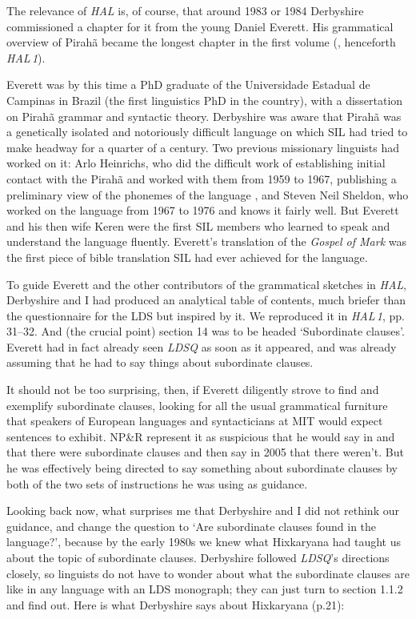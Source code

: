 \documentclass[output=paper,colorlinks,citecolor=brown
]{langscibook}
\begin{document}
The relevance of \textit{HAL} is, of course, that around 1983 or 1984
Derbyshire commissioned a chapter for it from the young Daniel Everett.
His grammatical overview of Pirah{\~a} became the longest chapter in
the first volume (\citealt{DerbPull86}, henceforth \textit{HAL\,1}).

Everett was by this time a PhD graduate of the Universidade Estadual
de Campinas in Brazil (the first linguistics PhD in the country),
with a dissertation on Pirah{\~a} grammar and syntactic theory.
Derbyshire was aware that Pirah{\~a} was a genetically isolated and
notoriously difficult language on which SIL had tried to make headway
for a quarter of a century. Two previous missionary linguists had
worked on it: Arlo Heinrichs, who did the difficult work of
establishing initial contact with the Pirah{\~a} and worked with them
from 1959 to 1967, publishing a preliminary view of the phonemes of
the language \citep{Heinrichs64}, and Steven Neil Sheldon, who worked
on the language from 1967 to 1976 and knows it fairly well. But Everett
and his then wife Keren were the first SIL members who learned to
speak and understand the language fluently. Everett's translation of
the \textit{Gospel of Mark} \citep{Everett86Mark} was the first piece
of bible translation SIL had ever achieved for the language.

To guide Everett and the other contributors of the grammatical sketches
in \textit{HAL}, Derbyshire and I had produced an analytical table
of contents, much briefer than the questionnaire for the LDS but
inspired by it. We reproduced it in \textit{HAL\,1}, pp.\,31--32.
And (the crucial point) section 14 was to be headed `Subordinate
clauses'. Everett had in fact already seen \textit{LDSQ} as soon as
it appeared, and was already assuming that he had to say things about
subordinate clauses.

It should not be too surprising, then, if Everett diligently strove
to find and exemplify subordinate clauses, looking for all the usual
grammatical furniture that speakers of European languages and
syntacticians at MIT would expect sentences to exhibit. NP\&R represent
it as suspicious that he would say in \citeyear{Everett83} and
\citeyear{Everett86HAL} that there were subordinate clauses and then
say in 2005 that there weren't. But he was effectively being directed
to say something about subordinate clauses by both of the two sets of
instructions he was using as guidance.

Looking back now, what surprises me that Derbyshire and I did not rethink
our guidance, and change the question to `Are subordinate clauses found
in the language?', because by the early 1980s we knew what Hixkaryana had
taught us about the topic of subordinate clauses. Derbyshire followed
\textit{LDSQ}'s directions closely, so linguists do not have to wonder
about what the subordinate clauses are like in any language with an
LDS monograph; they can just turn to section 1.1.2 and find out. Here
is what Derbyshire says about Hixkaryana (p.21):
\end{document}
